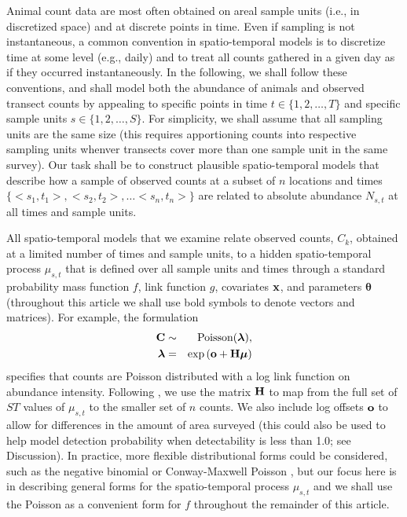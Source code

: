 \documentclass[times,mee,doublespace,]{besauth2}
\begin{document}
Animal count data are most often obtained on areal sample units (i.e., in discretized space) and at discrete points in time.  Even if sampling is not instantaneous, a common convention in spatio-temporal models is to discretize time at some level (e.g., daily) and to treat all counts gathered in a given day as if they occurred instantaneously. In the following, we shall follow these conventions, and shall model both the abundance of animals and observed transect counts by appealing to specific points in time $t \in  \{ 1,2,\hdots,T \} $ and specific sample units $s \in \{ 1,2,\hdots,S \}$.  For simplicity, we shall assume that all sampling units are the same size (this requires apportioning counts into respective sampling units whenver transects cover more than one sample unit in the same survey).  Our task shall be to construct plausible spatio-temporal models that describe how a sample of observed counts at a subset of $n$ locations and times $\{ <s_1,t_1>,<s_2,t_2>,\hdots <s_n,t_n> \}$ are related to absolute abundance $N_{s,t}$ at all times and sample units.

All spatio-temporal models that we examine relate observed counts, $C_k$, obtained at a limited number of times and sample units, to a hidden spatio-temporal process $\mu_{s,t}$ that is defined over all sample units and times through a standard probability mass function $f$, link function $g$, covariates ${\bf x}$, and parameters $\boldsymbol{\theta}$ (throughout this article we shall use bold symbols to denote vectors and matrices).  For example, the formulation
\begin{eqnarray}
  {\bf C} & \sim & \textrm{Poisson}(\boldsymbol{\lambda}), \nonumber \\
  \boldsymbol{\lambda} & = & \exp \left( {\bf o} + {\bf H}\boldsymbol{\mu} \right) 
  \label{eq:basic-mod}
\end{eqnarray}
specifies that counts are Poisson distributed with a log link function on abundance intensity. Following \citet{WikleHooten2010}, we use the matrix ${\bf H}$ to map from the full set of $ST$ values of $\mu_{s,t}$ to the smaller set of $n$ counts. We also include log offsets ${\bf o}$ to allow for differences in the amount of area surveyed (this could also be used to help model detection probability when detectability is less than 1.0; see Discussion).  In practice, more flexible distributional forms could be considered, such as the negative binomial or Conway-Maxwell Poisson \citep{WuEtAl2013}, but our focus here is in describing general forms for the spatio-temporal process $\mu_{s,t}$ and we shall use the Poisson as a convenient form for $f$ throughout the remainder of this article.
\end{document}
